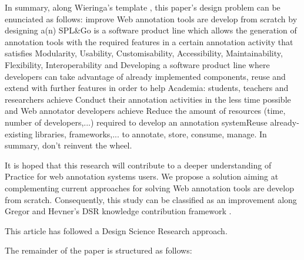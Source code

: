 \documentclass{article}
\begin{document}
In summary, along Wieringa's template \cite{Wieringa2014}, this paper's design problem can be enunciated as follows: 
improve Web annotation tools are develop from scratch
by designing a(n) SPL&Go is a software product line which allows the generation of annotation tools with the required features in a certain annotation activity
that satisfies Modularity, Usability, Customisability, Accessibility, Maintainability, Flexibility, Interoperability and Developing a software product line where developers can take advantage of already implemented components, reuse and extend with further features
in order to help Academia: students, teachers and researchers achieve Conduct their annotation activities in the less time possible and Web annotator developers achieve Reduce the amount of resources (time, number of developers,...) required to develop an annotation systemReuse already-existing libraries, frameworks,... to annotate, store, consume, manage. In summary, don't reinvent the wheel. 
    
It is hoped that this research will contribute to a deeper understanding of Practice for web annotation systems users. We propose a solution aiming at complementing current approaches for solving Web annotation tools are develop from scratch. Consequently, this study can be classified as an improvement along Gregor and Hevner’s DSR knowledge contribution framework \cite{Gregor2013}.
      
This article has followed a Design Science Research approach.

The remainder of the paper is structured as follows: 

    
      


\end{document}
